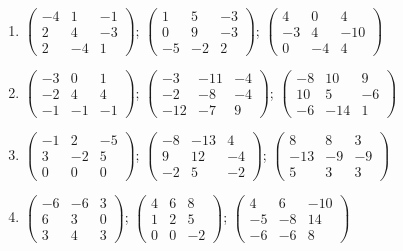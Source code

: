 \begin{enumerate}[label=\arabic*., leftmargin=*, itemsep=1pt]
\item $\left(\begin{smallmatrix}-4 & 1 & -1\\ 2 & 4 & -3\\ 2 & -4 & 1\end{smallmatrix}\right)$; $\left(\begin{smallmatrix}1 & 5 & -3\\ 0 & 9 & -3\\ -5 & -2 & 2\end{smallmatrix}\right)$; $\left(\begin{smallmatrix}4 & 0 & 4\\ -3 & 4 & -10\\ 0 & -4 & 4\end{smallmatrix}\right)$
\item $\left(\begin{smallmatrix}-3 & 0 & 1\\ -2 & 4 & 4\\ -1 & -1 & -1\end{smallmatrix}\right)$; $\left(\begin{smallmatrix}-3 & -11 & -4\\ -2 & -8 & -4\\ -12 & -7 & 9\end{smallmatrix}\right)$; $\left(\begin{smallmatrix}-8 & 10 & 9\\ 10 & 5 & -6\\ -6 & -14 & 1\end{smallmatrix}\right)$
\item $\left(\begin{smallmatrix}-1 & 2 & -5\\ 3 & -2 & 5\\ 0 & 0 & 0\end{smallmatrix}\right)$; $\left(\begin{smallmatrix}-8 & -13 & 4\\ 9 & 12 & -4\\ -2 & 5 & -2\end{smallmatrix}\right)$; $\left(\begin{smallmatrix}8 & 8 & 3\\ -13 & -9 & -9\\ 5 & 3 & 3\end{smallmatrix}\right)$
\item $\left(\begin{smallmatrix}-6 & -6 & 3\\ 6 & 3 & 0\\ 3 & 4 & 3\end{smallmatrix}\right)$; $\left(\begin{smallmatrix}4 & 6 & 8\\ 1 & 2 & 5\\ 0 & 0 & -2\end{smallmatrix}\right)$; $\left(\begin{smallmatrix}4 & 6 & -10\\ -5 & -8 & 14\\ -6 & -6 & 8\end{smallmatrix}\right)$
\end{enumerate}
